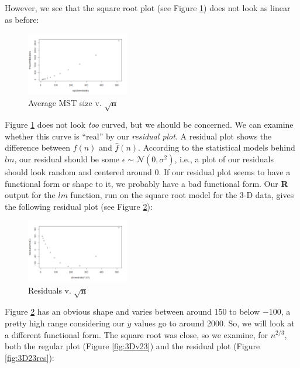 \documentclass[conference]{styles/acmsiggraph}
\newcommand{\?}{\stackrel{?}{=}}
\begin{document}
However, we see that the square root plot (see Figure \ref{fig:3DvROOT}) does not look as linear as before:

\begin{figure}[h!]
    \centering
    \includegraphics[width=0.4\textwidth]{3dplotsqrt.png}
    \caption{Average MST size v. $\mathbf{\sqrt{n}}$}
    \label{fig:3DvROOT}
\end{figure}
\FloatBarrier %

Figure \ref{fig:3DvROOT} does not look \textit{too} curved, but we should be concerned.  We can examine whether this curve is ``real'' by our \textit{residual plot}.  A residual plot shows the difference between $f(n)$ and $\hat{f}(n)$. According to the statistical models behind $lm$, our residual should be some $\epsilon \sim \mathcal{N}(0,\sigma^2)$, i.e., a plot of our residuals should look random and centered around $0$. If our residual plot seems to have a functional form or shape to it, we probably have a bad functional form.  Our \textbf{R} output for the $lm$ function, run on the square root model for the 3-D data, gives the following residual plot (see Figure \ref{fig:ROOTresid}):

\begin{figure}[h!]
    \centering
    \includegraphics[width=0.4\textwidth]{3dplotsres.png}
    \caption{Residuals v. $\mathbf{\sqrt{n}}$}
    \label{fig:ROOTresid}
\end{figure}
\FloatBarrier %

Figure \ref{fig:ROOTresid} has an obvious shape and varies between around 150 to below $-100$, a pretty high range considering our $y$ values go to around 2000. So, we will look at a different functional form.  The square root was close, so we examine, for $n^{2/3}$, both the regular plot (Figure \ref{fig:3Dv23}) and the residual plot (Figure \ref{fig:3D23res}):
\end{document}
